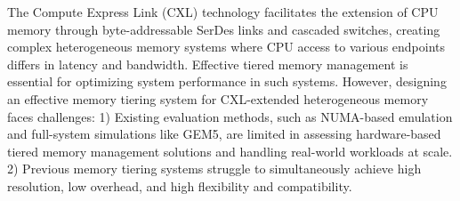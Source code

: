 The Compute Express Link (CXL) technology facilitates the extension of CPU memory through byte-addressable SerDes links and cascaded switches, creating complex heterogeneous memory systems where CPU access to various endpoints differs in latency and bandwidth. Effective tiered memory management is essential for optimizing system performance in such systems. 
However, designing an effective memory tiering system for CXL-extended heterogeneous memory faces challenges: 
1) Existing evaluation methods, such as NUMA-based emulation and full-system simulations like GEM5, are limited in assessing hardware-based tiered memory management solutions and handling real-world workloads at scale.
2) Previous memory tiering systems struggle to simultaneously achieve high resolution, low overhead, and high flexibility and compatibility.


